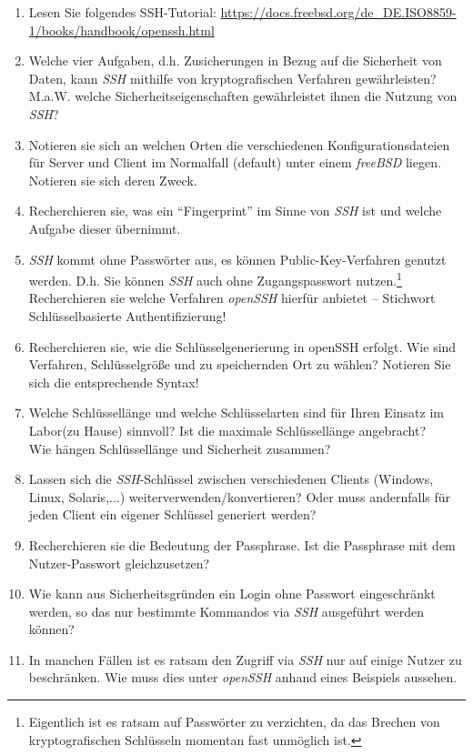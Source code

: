 \documentclass[paper=a4,fontsize=11pt]{scrartcl}%
\numberwithin{equation}{section}
\begin{document}
	\begin{enumerate}
		\item Lesen Sie folgendes SSH-Tutorial: \url{https://docs.freebsd.org/de_DE.ISO8859-1/books/handbook/openssh.html}
		\item Welche vier Aufgaben, d.h. Zusicherungen in Bezug auf die Sicherheit von Daten, kann \emph{SSH} mithilfe von kryptografischen Verfahren gewährleisten? M.a.W. welche Sicherheitseigenschaften gewährleistet ihnen die Nutzung von \emph{SSH}?	
		\item Notieren sie sich an welchen Orten die verschiedenen Konfigurationsdateien für Server und Client im Normalfall (default) unter einem \emph{freeBSD} liegen. Notieren sie sich deren Zweck.
		\item Recherchieren sie, was ein \enquote{Fingerprint} im Sinne von \emph{SSH} ist und welche Aufgabe dieser übernimmt. 
		\item \emph{SSH} kommt ohne Passwörter aus, es können Public-Key-Verfahren genutzt werden. D.h. Sie können \emph{SSH} auch ohne Zugangspasswort nutzen.\footnote{Eigentlich ist es ratsam auf Passwörter zu verzichten, da das Brechen von kryptografischen Schlüsseln momentan fast unmöglich ist.}\\
		Recherchieren sie welche Verfahren \emph{openSSH} hierfür anbietet -- Stichwort Schlüsselbasierte Authentifizierung!
		\item Recherchieren sie, wie die Schlüsselgenerierung in openSSH erfolgt. Wie sind Verfahren, Schlüsselgröße und zu speichernden Ort zu wählen? Notieren Sie sich die entsprechende Syntax!
		\item Welche Schlüssellänge und welche Schlüsselarten sind für Ihren Einsatz im Labor(zu Hause) sinnvoll? Ist die maximale Schlüssellänge angebracht?\\
		Wie hängen Schlüssellänge und Sicherheit zusammen?
		\item Lassen sich die \emph{SSH}-Schlüssel zwischen verschiedenen Clients (Windows, Linux, Solaris,...) weiterverwenden/konvertieren? Oder muss andernfalls für jeden Client ein eigener Schlüssel generiert werden?
		\item Recherchieren sie die Bedeutung der Passphrase. Ist die Passphrase mit dem Nutzer-Passwort gleichzusetzen?
		\item Wie kann aus Sicherheitsgründen ein Login ohne Passwort eingeschränkt werden, so das nur bestimmte Kommandos via \emph{SSH} ausgeführt werden können?
		\item In manchen Fällen ist es ratsam den Zugriff via \emph{SSH} nur auf einige Nutzer zu beschränken. Wie muss dies unter \emph{openSSH} anhand eines Beispiels aussehen.
	\end{enumerate}
	
\end{document}
